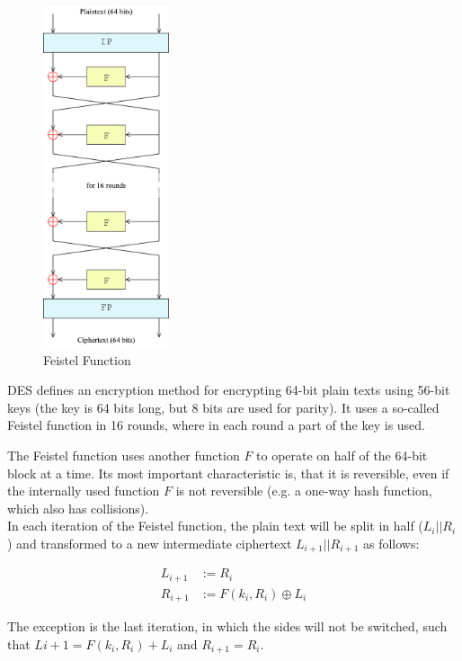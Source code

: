 \begin{figure}
    \begin{center}
        \includegraphics[width=0.33\textwidth]{gfx/feistel_function.png}
    \end{center}
    \caption{Feistel Function}
    \label{fig:feistel}
\end{figure}

DES defines an encryption method for encrypting 64-bit plain texts using 56-bit keys (the key is 64 bits long, but 8 bits are used for parity). It uses a so-called Feistel function in 16 rounds, where in each round a part of the key is used.

The Feistel function uses another function $F$ to operate on half of the 64-bit block at a time. Its most important characteristic is, that it is reversible, even if the internally used function $F$ is not reversible (e.g. a one-way hash function, which also has collisions).\\
In each iteration of the Feistel function, the plain text will be split in half ($L_i||R_i$) and transformed to a new intermediate ciphertext $L_{i+1}||R_{i+1}$ as follows:

\begin{align*}
    L_{i+1} & := R_i                   \\
    R_{i+1} & := F(k_i,R_i) \oplus L_i
\end{align*}

The exception is the last iteration, in which the sides will not be switched, such that $L{i+1} = F(k_i,R_i) + L_i$ and $R_{i+1} = R_i$.

